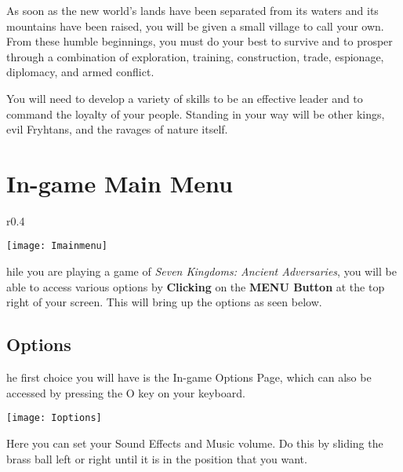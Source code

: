 As soon as the new world’s lands have been separated from its waters and its mountains have been raised, you will be given a small village to call your own. From these humble beginnings, you must do your best to survive and to prosper through a combination of exploration, training, construction, trade, espionage, diplomacy, and armed conflict.

You will need to develop a variety of skills to be an effective leader and to command the loyalty of your people. Standing in your way will be other kings, evil Fryhtans, and the ravages of nature itself.


\section{In-game Main Menu}


\begin{wrapfigure}{r}{0.4\textwidth}
	\begin{center}
		\vspace{-20pt}
		\texttt{[image: Imainmenu]} %
	\end{center}
	\vspace{-40pt}
\end{wrapfigure}


hile you are playing a game of \textit{Seven Kingdoms: Ancient Adversaries}, you will be able to access various options by \textbf{Clicking} on the \textbf{MENU Button} at the top right of your screen. This will bring up the options as seen below.

\subsection{Options}


he first choice you will have is the In-game Options Page, which can also be accessed by pressing the O key on your keyboard.

\begin{center}
	\texttt{[image: Ioptions]} %
\end{center}

Here you can set your Sound Effects and Music volume. Do this by sliding the brass ball left or right until it is in the position that you want.


